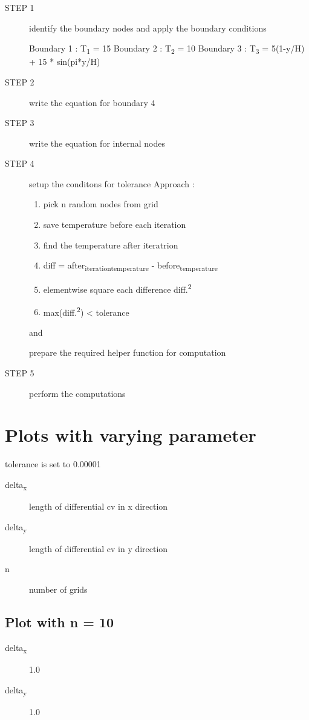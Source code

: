 \documentclass[11pt]{article}
\begin{document}
\begin{description}
\item[{STEP 1}] identify the boundary nodes and apply the
boundary conditions  

Boundary 1 : T\textsubscript{1} = 15
Boundary 2 : T\textsubscript{2} = 10 
Boundary 3 : T\textsubscript{3} = 5(1-y/H) + 15 * sin(pi*y/H)

\item[{STEP 2}] write the equation for boundary 4

\item[{STEP 3}] write the equation for internal nodes

\item[{STEP 4}] setup the conditons for tolerance
Approach :
\begin{enumerate}
\item pick n random nodes from grid
\item save temperature before each iteration
\item find the temperature after iteratrion
\item diff = after\textsubscript{iteration}\textsubscript{temperature} - before\textsubscript{temperature}
\item elementwise square each difference
diff.\textsuperscript{2}
\item max(diff.\textsuperscript{2}) < tolerance
\end{enumerate}
and

prepare the required helper function for computation

\item[{STEP 5}] perform the computations
\end{description}
\section{Plots with varying parameter}
\label{sec:org3b1be60}

tolerance is set to  0.00001 

\begin{description}
\item[{delta\textsubscript{x}}] length of differential cv in x  direction
\item[{delta\textsubscript{y}}] length of differential cv in y  direction
\item[{n}] number of grids
\end{description}
\subsection{Plot with n = 10}
\label{sec:org794e5ef}
\begin{description}
\item[{delta\textsubscript{x}}] 1.0
\item[{delta\textsubscript{y}}] 1.0
\end{description}
\end{document}
